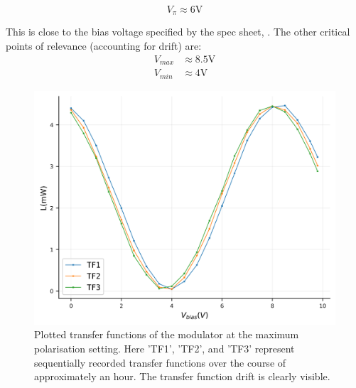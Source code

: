 \documentclass[12pt,a4paper]{report}
\begin{document}
\begin{equation}
    V_{\pi} \approx 6\text{V}
    \label{quadpoint}
\end{equation}

This is close to the bias voltage specified by the spec sheet, \cite{modulator-spec}. The other critical points of relevance (accounting for drift) are:
\begin{align*}
    V_{max} &\approx 8.5\text{V}\\
    V_{min} &\approx 4\text{V}
\end{align*}

\begin{figure}
\centering
\includegraphics[width=0.85\columnwidth]{Transfer Function 3(mW)_figure_all.png} 
\caption{Plotted transfer functions of the modulator at the maximum polarisation setting. Here 'TF1', 'TF2', and 'TF3' represent sequentially recorded transfer functions over the course of approximately an hour. The transfer function drift is clearly visible.}
\label{fig-transfer2}
\end{figure}
\end{document}
